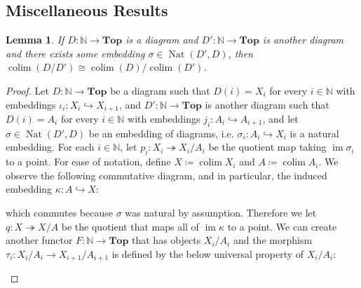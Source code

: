 \documentclass{article}
\newcommand{\N}{\mathbb{N}}
\DeclareMathOperator{\im}{im}
\DeclareMathOperator{\colim}{colim}
\DeclareMathOperator{\Nat}{Nat}
\newcommand{\Top}{\mathbf{Top}} %
\newtheorem{lemma}[theorem]{Lemma}
\begin{document}
\subsection*{Miscellaneous Results}
\begin{lemma}
        If $D:\N \to \Top$ is a diagram and $D':\N \to \Top$ is another diagram and there exists some embedding $\sigma\in \Nat(D',D)$, then $\colim (D/D') \cong \colim (D)/\colim (D')$.
    \end{lemma}
    \begin{proof}
        Let $D:\N \to \Top$ be a diagram such that $D(i)=X_i$ for every $i\in \N$ with embeddings $\iota_i:X_i\hookrightarrow X_{i+1}$, and $D':\N \to \Top$ is another diagram such that $D(i)=A_i$ for every $i\in \N$  with embeddings $j_i:A_i\hookrightarrow A_{i+1}$, and let $\sigma \in \Nat(D',D)$ be an embedding of diagrams, i.e. $\sigma_i:A_i\hookrightarrow X_i$ is a natural embedding. For each $i\in \N$, let $p_i:X_i \twoheadrightarrow X_i/A_i$ be the quotient map taking $\im \sigma_i$ to a point. For ease of notation, define $X\coloneqq \colim X_i$ and $A\coloneqq \colim A_i$. We observe the following commutative diagram, and in particular, the induced embedding $\kappa:A\hookrightarrow X$:
        \begin{center}
    \end{center}
    which commutes because $\sigma$ was natural by assumption. Therefore we let $q:X\twoheadrightarrow X/A$ be the quotient that maps all of $\im \kappa$ to a point. We can create another functor $F:\N \to \Top$ that has objects $X_i/A_i$ and the morphism $\tau_i:X_i/A_i \to X_{i+1}/A_{i+1}$ is defined by the below universal property of $X_i/A_i:$
    \begin{center}
    \end{center}
    

\end{proof}
\end{document}
